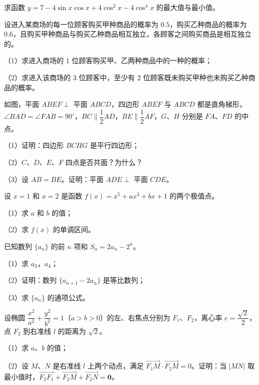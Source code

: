 \begin{question}
求函数 $y=7-4\sin x\cos x+4\cos^2x-4\cos^4x$ 的最大值与最小值。

\end{question}
\begin{question}
设进入某商场的每一位顾客购买甲种商品的概率为 $0.5$，购买乙种商品的概率为 $0.6$，且购买甲种商品与购买乙种商品相互独立，各顾客之间购买商品是相互独立的。

（1）求进入商场的 $1$ 位顾客购买甲、乙两种商品中的一种的概率；

（2）求进入该商场的 $3$ 位顾客中，至少有 $2$ 位顾客既未购买甲种也未购买乙种商品的概率。

\Needspace{0.4\textheight}
\end{question}
\begin{question}
如图，平面 $ABEF\perp$ 平面 $ABCD$，四边形 $ABEF$ 与 $ABCD$ 都是直角梯形，$\angle BAD=\angle FAB=90^\circ$，$BC\parallel\dfrac12AD$，$BE\parallel\dfrac12AF$，$G$、$H$ 分别是 $FA$、$FD$ 的中点。

（1）证明：四边形 $BCHG$ 是平行四边形；

（2）$C$、$D$、$E$、$F$ 四点是否共面？为什么？

（3）设 $AB=BE$。证明：平面 $ADE\perp$ 平面 $CDE$。
\nopagebreak[4]
\begin{center}\end{center}
\nopagebreak[4]
\end{question}
\begin{question}
设 $x=1$ 和 $x=2$ 是函数 $f(x)=x^5+ax^3+bx+1$ 的两个极值点。

（1）求 $a$ 和 $b$ 的值；

（2）求 $f(x)$ 的单调区间。

\end{question}
\begin{question}
已知数列 $\{a_n\}$ 的前 $n$ 项和 $S_n=2a_n-2^n$。

（1）求 $a_3$，$a_4$；

（2）证明：数列 $\{a_{n+1}-2a_n\}$ 是等比数列；

（3）求 $\{a_n\}$ 的通项公式。

\end{question}
\begin{question}
设椭圆 $\dfrac{x^2}{a^2}+\dfrac{y^2}{b^2}=1$（$a>b>0$）的左、右焦点分别为 $F_1$、$F_2$，离心率 $e=\dfrac{\sqrt2}2$，点 $F_2$ 到右准线 $l$ 的距离为 $\sqrt2$。

（1）求 $a$、$b$ 的值；

（2）设 $M$、$N$ 是右准线 $l$ 上两个动点，满足 $\overrightarrow{F_1M}\cdot\overrightarrow{F_2M}=0$。证明：当 $|MN|$ 取最小值时，$\overrightarrow{F_2F_1}+\overrightarrow{F_2M}+\overrightarrow{F_2N}=\boldsymbol 0$。

\end{question}
